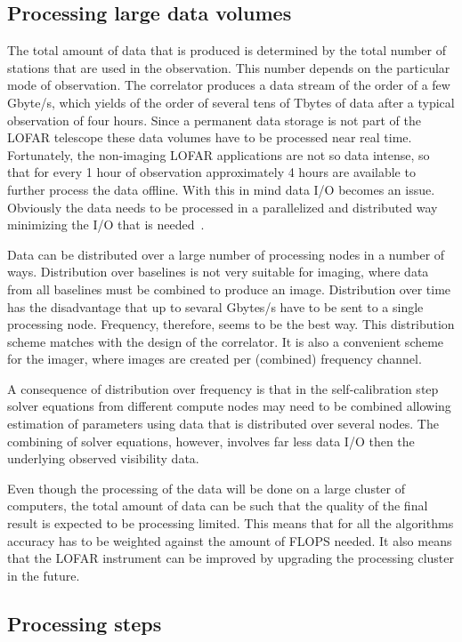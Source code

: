 \documentclass[journal]{IEEEtran}
\begin{document}
\subsection{Processing large data volumes}

The total amount of data that is produced is determined by the total number of stations that are used in the observation. This number depends on the particular mode of observation. The correlator produces a data stream of the order of a few Gbyte/s, which yields of the order of several tens of Tbytes of data after a typical observation of four hours. Since a permanent data storage is not part of the LOFAR telescope these data volumes have to be processed near real time. Fortunately, the non-imaging LOFAR applications are not so data intense, so that for every 1 hour of observation approximately 4 hours are available to further process the data offline. With this in mind data I/O becomes an issue. Obviously the data needs to be processed in a parallelized and distributed way minimizing the I/O that is needed~\cite{Loose:08,Diepen:08}.  
 
Data can be distributed over a large number of processing nodes in a number of ways. Distribution over baselines is not very suitable for imaging, where data from all baselines must be combined to produce an image. Distribution over time has the disadvantage that up to sevaral Gbytes/s have to be sent to a single processing node. Frequency, therefore, seems to be the best way. This distribution scheme matches with the design of the correlator. It is also a convenient scheme for the imager, where images are created per (combined) frequency channel.

A consequence of distribution over frequency is that in the self-calibration step solver equations from different compute nodes may need to be combined allowing estimation of parameters using data that is distributed over several nodes. The combining of solver equations, however, involves far less data I/O then the underlying observed visibility data.   

Even though the processing of the data will be done on a large cluster of computers, the total amount of data can be such that the quality of the final result is expected to be processing limited. This means that for all the algorithms accuracy has to be weighted against the amount of FLOPS needed. It also means that the LOFAR instrument can be improved by upgrading the processing cluster in the future. 

\subsection{Processing steps}
\end{document}
